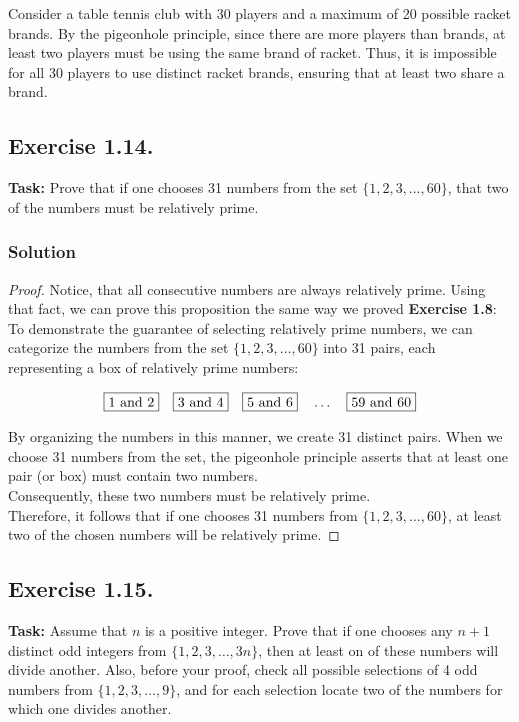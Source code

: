\documentclass{article}
\begin{document}
Consider a table tennis club with 30 players and a maximum of 20 possible racket brands. By the pigeonhole principle, since there are more players than brands, at least two players must be using the same brand of racket. Thus, it is impossible for all 30 players to use distinct racket brands, ensuring that at least two share a brand.

\subsection{Exercise 1.14.}
\textbf{Task:} Prove that if one chooses 31 numbers from the set $\{1,2,3,\dots,60\}$, that two of the numbers must be relatively prime.

\subsubsection*{Solution}

\begin{proof}
    Notice, that all consecutive numbers are always relatively prime. Using that fact, we can prove this proposition the same way we proved \textbf{Exercise 1.8}: \\
    To demonstrate the guarantee of selecting relatively prime numbers, we can categorize the numbers from the set $\{1, 2, 3, \ldots, 60\}$ into 31 pairs, each representing a box of relatively prime numbers:

    \[
    \fbox{1 and 2} \quad \fbox{3 and 4} \quad \fbox{5 and 6} \quad \dots \quad \fbox{59 and 60}
    \]

    By organizing the numbers in this manner, we create 31 distinct pairs. When we choose 31 numbers from the set, the pigeonhole principle asserts that at least one pair (or box) must contain two numbers. \\Consequently, these two numbers must be relatively prime.\\
    Therefore, it follows that if one chooses 31 numbers from $\{1, 2, 3, \ldots, 60\}$, at least two of the chosen numbers will be relatively prime.
\end{proof}

\newpage

\subsection{Exercise 1.15.} 
\textbf{Task:} Assume that $n$ is a positive integer. Prove that if one chooses any $n+1$ distinct odd integers from $\{1, 2, 3, \ldots, 3n\}$, then at least on of these numbers will divide another. Also, before your proof, check all possible selections of 4 odd numbers from $\{1, 2, 3, \ldots, 9\}$, and for each selection locate two of the numbers for which one divides another.
\end{document}
